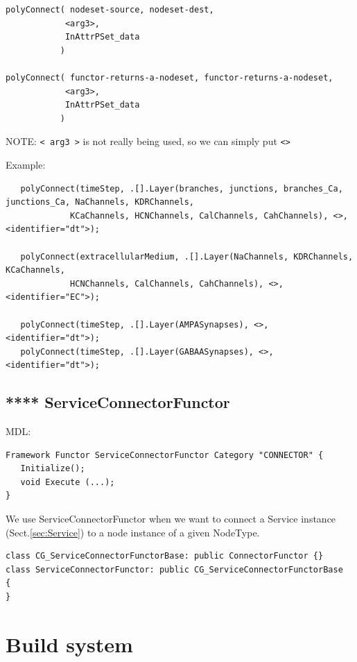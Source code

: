 \begin{verbatim}
polyConnect( nodeset-source, nodeset-dest, 
            <arg3>,
            InAttrPSet_data
           )

polyConnect( functor-returns-a-nodeset, functor-returns-a-nodeset, 
            <arg3>,
            InAttrPSet_data
           )
\end{verbatim}

NOTE: \verb!< arg3 >! is not really being used, so we can simply put
\verb!<>!

Example:
{\tiny
\begin{verbatim}
   polyConnect(timeStep, .[].Layer(branches, junctions, branches_Ca, junctions_Ca, NaChannels, KDRChannels, 
             KCaChannels, HCNChannels, CalChannels, CahChannels), <>,    <identifier="dt">);
   
   polyConnect(extracellularMedium, .[].Layer(NaChannels, KDRChannels, KCaChannels, 
             HCNChannels, CalChannels, CahChannels), <>,    <identifier="EC">);
   
   polyConnect(timeStep, .[].Layer(AMPASynapses), <>, <identifier="dt">);
   polyConnect(timeStep, .[].Layer(GABAASynapses), <>, <identifier="dt">);

\end{verbatim}
}


\subsection{**** ServiceConnectorFunctor}
\label{sec:ServiceConnectorFunctor}

MDL:
\begin{verbatim}
Framework Functor ServiceConnectorFunctor Category "CONNECTOR" {
   Initialize();
   void Execute (...);
}
\end{verbatim}

We use ServiceConnectorFunctor when we want to connect a Service instance
(Sect.\ref{sec:Service}) to a node instance of a given NodeType.

\begin{verbatim}
class CG_ServiceConnectorFunctorBase: public ConnectorFunctor {}
class ServiceConnectorFunctor: public CG_ServiceConnectorFunctorBase
{
}
\end{verbatim}

\section{Build system }

